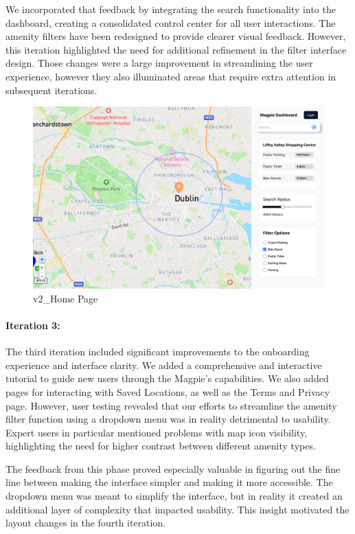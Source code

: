 We incorporated that feedback by integrating the search functionality into the
dashboard, creating a consolidated control center for all user interactions. 
The amenity filters have been redesigned to provide clearer visual feedback. 
However, this iteration highlighted the need for additional refinement in the 
filter interface design. Those changes were a large improvement in streamlining 
the user experience, however they also illuminated areas that require extra 
attention in subsequent iterations.
\begin{figure}[htbp]
    \centering
    \begin{minipage}{0.48\textwidth}
        \centering
        \includegraphics[width=\textwidth]{images/v2_Home Page.png}
        \caption{v2\_Home Page}
        \label{fig:v2_Home Page}
    \end{minipage}
\end{figure}


\paragraph{Iteration 3:}
The third iteration included significant improvements to the onboarding experience 
and interface clarity. We added a comprehensive and interactive tutorial to guide 
new users through the Magpie's capabilities. We also added pages for interacting 
with Saved Locations, as well as the Terms and Privacy page. However, user testing 
revealed that our efforts to streamline the amenity filter function using a dropdown 
menu was in reality detrimental to usability. Expert users in particular mentioned 
problems with map icon visibility, highlighting the need for higher contrast between 
different amenity types.

The feedback from this phase proved especially valuable in figuring out the
fine line between making the interface simpler and making it more accessible.
The dropdown menu was meant to simplify the interface, but in reality it created
an additional layer of complexity that impacted usability. This insight motivated 
the layout changes in the fourth iteration.

